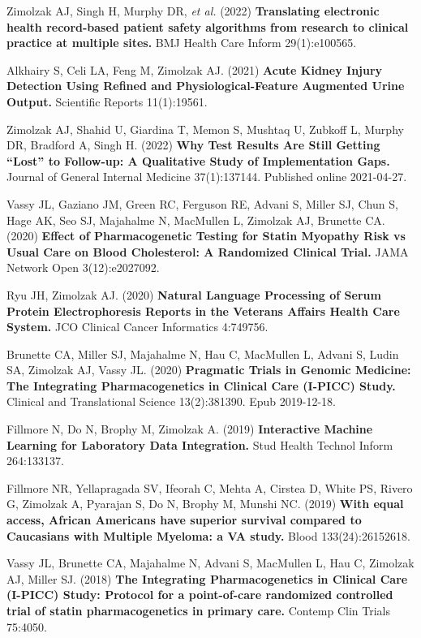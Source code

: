 \documentclass[10pt]{article}
\begin{document}
Zimolzak AJ, Singh H, Murphy DR, \emph{et al.} (2022)
\textbf{Translating electronic health record-based patient safety
  algorithms from research to clinical practice at multiple sites.}
BMJ Health Care Inform 29(1):e100565.

Alkhairy S, Celi LA, Feng M, Zimolzak AJ. (2021) \textbf{Acute Kidney
  Injury Detection Using Refined and Phys\-i\-o\-log\-i\-cal-Fea\-ture
  Augmented Urine Output.} Scientific Reports 11(1):19561.

Zimolzak AJ, Shahid U, Giardina T, Memon S, Mushtaq U, Zubkoff L,
Murphy DR, Bradford A, Singh H. (2022) \textbf{Why Test Results Are
  Still Getting ``Lost'' to Follow-up: A Qualitative Study of
  Implementation Gaps.} Journal of General Internal Medicine
37(1):137\ndash{}144. Published online 2021-04-27.

Vassy JL, Gaziano JM, Green RC, Ferguson RE, Advani S, Miller SJ, Chun
S, Hage AK, Seo SJ, Majahalme N, MacMullen L, Zimolzak AJ, Brunette
CA. (2020) \textbf{Effect of Pharmacogenetic Testing for Statin
  Myopathy Risk vs Usual Care on Blood Cholesterol: A Randomized
  Clinical Trial.} JAMA Network Open 3(12):e2027092.

Ryu JH, Zimolzak AJ. (2020) \textbf{Natural Language Processing of
  Serum Protein Electrophoresis Reports in the Veterans Affairs Health
  Care System.} JCO Clinical Cancer Informatics 4:749\ndash{}756.

Brunette CA, Miller SJ, Majahalme N, Hau C, MacMullen L, Advani S,
Ludin SA, Zimolzak AJ, Vassy JL. (2020) \textbf{Pragmatic Trials in
  Genomic Medicine: The Integrating Pharmacogenetics in Clinical Care
  (I-PICC) Study.} Clinical and Translational Science
13(2):381\ndash{}390. Epub 2019-12-18.

Fillmore N, Do N, Brophy M, Zimolzak A. (2019) \textbf{Interactive
  Machine Learning for Laboratory Data Integration.} Stud Health
Technol Inform 264:133\ndash{}137.

Fillmore NR, Yellapragada SV, Ifeorah C, Mehta A, Cirstea D, White PS,
Rivero G, Zimolzak A, Pyarajan S, Do N, Brophy M, Munshi NC. (2019)
\textbf{With equal access, African Americans have superior survival
  compared to Caucasians with Multiple Myeloma: a VA study.} Blood
133(24):2615\ndash{}2618.

Vassy JL, Brunette CA, Majahalme N, Advani S, MacMullen L, Hau C,
Zimolzak AJ, Miller SJ. (2018) \textbf{The Integrating
  Pharmacogenetics in Clinical Care (I-PICC) Study: Protocol for a
  point-of-care randomized controlled trial of statin pharmacogenetics
  in primary care.} Contemp Clin Trials 75:40\ndash{}50.
\end{document}
